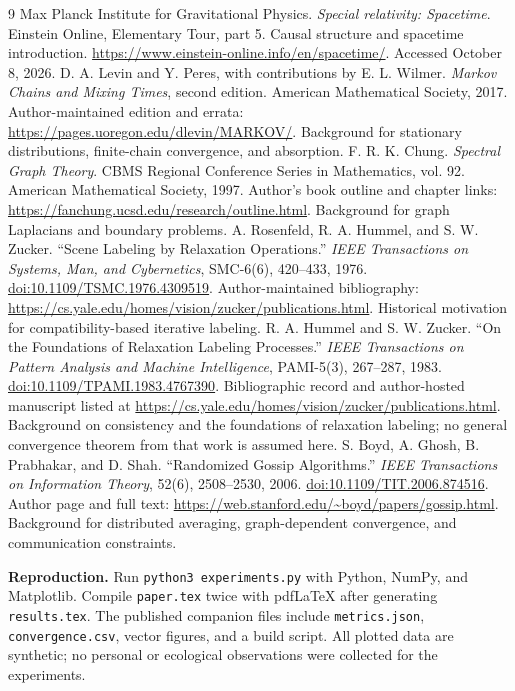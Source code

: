 \documentclass[12pt]{article}
\begin{document}
\clearpage
\begin{thebibliography}{9}
 Max Planck Institute for Gravitational Physics. \emph{Special relativity: Spacetime}. Einstein Online, Elementary Tour, part 5. Causal structure and spacetime introduction. \url{https://www.einstein-online.info/en/spacetime/}. Accessed October 8, 2026.
 D. A. Levin and Y. Peres, with contributions by E. L. Wilmer. \emph{Markov Chains and Mixing Times}, second edition. American Mathematical Society, 2017. Author-maintained edition and errata: \url{https://pages.uoregon.edu/dlevin/MARKOV/}. Background for stationary distributions, finite-chain convergence, and absorption.
 F. R. K. Chung. \emph{Spectral Graph Theory}. CBMS Regional Conference Series in Mathematics, vol. 92. American Mathematical Society, 1997. Author's book outline and chapter links: \url{https://fanchung.ucsd.edu/research/outline.html}. Background for graph Laplacians and boundary problems.
 A. Rosenfeld, R. A. Hummel, and S. W. Zucker. ``Scene Labeling by Relaxation Operations.'' \emph{IEEE Transactions on Systems, Man, and Cybernetics}, SMC-6(6), 420--433, 1976. \href{https://doi.org/10.1109/TSMC.1976.4309519}{doi:10.1109/TSMC.1976.4309519}. Author-maintained bibliography: \url{https://cs.yale.edu/homes/vision/zucker/publications.html}. Historical motivation for compatibility-based iterative labeling.
 R. A. Hummel and S. W. Zucker. ``On the Foundations of Relaxation Labeling Processes.'' \emph{IEEE Transactions on Pattern Analysis and Machine Intelligence}, PAMI-5(3), 267--287, 1983. \href{https://doi.org/10.1109/TPAMI.1983.4767390}{doi:10.1109/TPAMI.1983.4767390}. Bibliographic record and author-hosted manuscript listed at \url{https://cs.yale.edu/homes/vision/zucker/publications.html}. Background on consistency and the foundations of relaxation labeling; no general convergence theorem from that work is assumed here.
 S. Boyd, A. Ghosh, B. Prabhakar, and D. Shah. ``Randomized Gossip Algorithms.'' \emph{IEEE Transactions on Information Theory}, 52(6), 2508--2530, 2006. \href{https://doi.org/10.1109/TIT.2006.874516}{doi:10.1109/TIT.2006.874516}. Author page and full text: \url{https://web.stanford.edu/~boyd/papers/gossip.html}. Background for distributed averaging, graph-dependent convergence, and communication constraints.
\end{thebibliography}
\vfill\noindent\textbf{Reproduction.} Run \texttt{python3 experiments.py} with Python, NumPy, and Matplotlib. Compile \texttt{paper.tex} twice with pdfLaTeX after generating \texttt{results.tex}. The published companion files include \texttt{metrics.json}, \texttt{convergence.csv}, vector figures, and a build script. All plotted data are synthetic; no personal or ecological observations were collected for the experiments.
\end{document}
